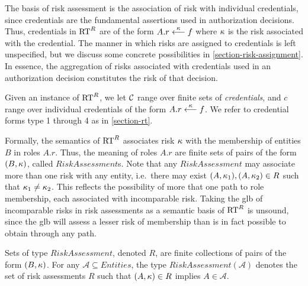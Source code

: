 The basis of risk assessment is the association of risk with
individual credentials, since credentials are the fundamental
assertions used in authorization decisions.  Thus, credentials in
$\text{RT}^R$ are of the form $A.r \stackrel{\kappa}{\longleftarrow} f$ where $\kappa$ is the
risk associated with the credential.  The manner in which risks are
assigned to credentials is left unspecified, but we discuss some
concrete possibilities in \autoref{section-risk-assignment}.  In
essence, the aggregation of risks associated with credentials used in
an authorization decision constitutes the risk of that decision.
\begin{definition}
Given an instance of $\text{RT}^R$, we let $\mathcal{C}$ range over finite sets of
\emph{credentials}, and $c$ range over individual credentials of the
form $A.r \stackrel{\kappa}{\longleftarrow} f$.  We refer to credential forms type 1
through 4 as in \autoref{section-rt}.
\end{definition}

Formally, the semantics of $\text{RT}^R$ associates risk $\kappa$ with the
membership of entities $B$ in roles $A.r$.  Thus, the meaning of roles
$A.r$ are finite sets of pairs of the form $(B,\kappa)$, called
$\mathit{RiskAssessment}$s.  Note that any $\mathit{RiskAssessment}$
may associate more than one risk with any entity, i.e.~there may exist
$(A,\kappa_1),(A,\kappa_2) \in R$ such that $\kappa_1 \ne \kappa_2$.  This
reflects the possibility of more that one path to role membership,
each associated with incomparable risk.  Taking the glb of
incomparable risks in risk assessments as a semantic basis of $\text{RT}^R$
is unsound, since the glb will assess a lesser risk of membership than
is in fact possible to obtain through any path.

\begin{definition}
\label{def-risk-assessment}
Sets of type $\mathit{RiskAssessment}$, denoted $R$, are finite
collections of pairs of the form $(B,\kappa)$. For any
$\mathcal{A}\subseteq \mathit{Entities}$, the type
$\mathit{RiskAssessment}(\mathcal{A})$ denotes the set of risk
assessments $R$ such that $(A,\kappa) \in R$ implies $A \in
\mathcal{A}$.
\end{definition}

